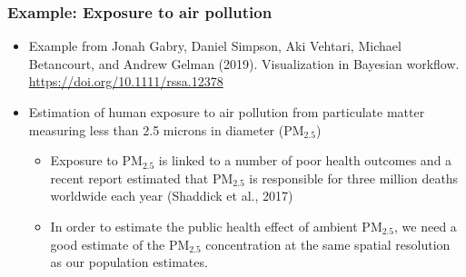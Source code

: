 \documentclass[10pt]{beamer}
\begin{document}
\begin{frame}

\frametitle{Example: Exposure to air pollution}

  \begin{itemize}
  \item Example from Jonah Gabry, Daniel Simpson, Aki Vehtari, Michael
    Betancourt, and Andrew Gelman (2019). Visualization in Bayesian
    workflow. \url{https://doi.org/10.1111/rssa.12378}
  \item Estimation of human exposure to air pollution from particulate
    matter measuring less than 2.5 microns in diameter ($\mathrm{PM}_{2.5}$)
    \begin{itemize}
    \item Exposure to $\mathrm{PM}_{2.5}$ is linked to a number of
      poor health outcomes and a recent report estimated that
      $\mathrm{PM}_{2.5}$ is responsible for three million deaths
      worldwide each year (Shaddick et al., 2017)
    \item In order to estimate the public health effect of ambient
      $\mathrm{PM}_{2.5}$, we need a good estimate of the
      $\mathrm{PM}_{2.5}$ concentration at the same spatial resolution
      as our population estimates.
    \end{itemize}
\end{itemize}

\end{frame}
\end{document}
